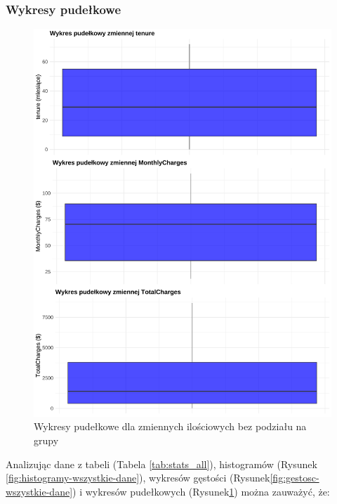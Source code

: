 \documentclass[12pt, a4paper]{article}\usepackage[]{graphicx}\usepackage[]{xcolor}
\makeatletter
\def\maxwidth{ %
  \ifdim\Gin@nat@width>\linewidth
    \linewidth
  \else
    \Gin@nat@width
  \fi
}
\newenvironment{knitrout}{}{} %
\makeatother
\begin{document}
\subsubsection{Wykresy pudełkowe}
\begin{knitrout}
\color{fgcolor}\begin{figure}[H]

{\centering \includegraphics[width=\maxwidth]{figure/boxploty-wszystkie-dane-1} 

}

\caption[Wykresy pudełkowe dla zmiennych ilościowych bez podziału na grupy]{Wykresy pudełkowe dla zmiennych ilościowych bez podziału na grupy}\label{fig:boxploty-wszystkie-dane}
\end{figure}

\end{knitrout}


Analizując dane z tabeli (Tabela \ref{tab:stats_all}), histogramów (Rysunek \ref{fig:histogramy-wszystkie-dane}), wykresów gęstości (Rysunek\ref{fig:gestosc-wszystkie-dane}) i wykresów pudełkowych (Rysunek\ref{fig:boxploty-wszystkie-dane}) można zauważyć, że:
\end{document}
